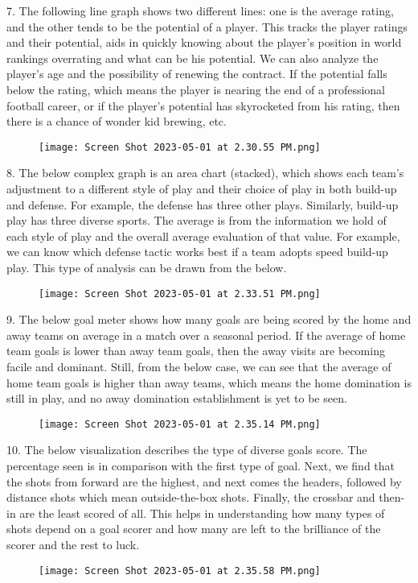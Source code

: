 \documentclass[lettersize]{IEEEtran}
\begin{document}
7. The following line graph shows two different lines: one is the average rating, and the other tends to be the potential of a player. This tracks the player ratings and their potential, aids in quickly knowing about the player's position in world rankings overrating and what can be his potential. We can also analyze the player's age and the possibility of renewing the contract. If the potential falls below the rating, which means the player is nearing the end of a professional football career, or if the player's potential has skyrocketed from his rating, then there is a chance of wonder kid brewing, etc.
\begin{figure}[H]
    \centering
    \texttt{[image: Screen Shot 2023-05-01 at 2.30.55 PM.png]}
\end{figure}

8. The below complex graph is an area chart (stacked), which shows each team's adjustment to a different style of play and their choice of play in both build-up and defense. For example, the defense has three other plays. Similarly, build-up play has three diverse sports. The average is from the information we hold of each style of play and the overall average evaluation of that value. For example, we can know which defense tactic works best if a team adopts speed build-up play. This type of analysis can be drawn from the below. 
\begin{figure}[H]
    \centering
    \texttt{[image: Screen Shot 2023-05-01 at 2.33.51 PM.png]}
\end{figure}

9. The below goal meter shows how many goals are being scored by the home and away teams on average in a match over a seasonal period. If the average of home team goals is lower than away team goals, then the away visits are becoming facile and dominant. Still, from the below case, we can see that the average of home team goals is higher than away teams, which means the home domination is still in play, and no away domination establishment is yet to be seen.
\begin{figure}[H]
    \centering
    \texttt{[image: Screen Shot 2023-05-01 at 2.35.14 PM.png]}
\end{figure}

10. The below visualization describes the type of diverse goals score. The percentage seen is in comparison with the first type of goal. Next, we find that the shots from forward are the highest, and next comes the headers, followed by distance shots which mean outside-the-box shots. Finally, the crossbar and then-in are the least scored of all. This helps in understanding how many types of shots depend on a goal scorer and how many are left to the brilliance of the scorer and the rest to luck. 
\begin{figure}[H]
    \centering
    \texttt{[image: Screen Shot 2023-05-01 at 2.35.58 PM.png]}
\end{figure}
\end{document}

